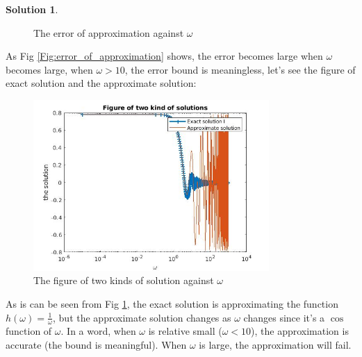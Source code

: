 \documentclass{article}
\theoremstyle{definition}
\newtheorem{solution}{Solution}
\begin{document}
\begin{solution}
\begin{figure}[ht]
      \centering
      \caption{The error of approximation against $\omega$}
    \end{figure}
    As Fig \ref{Fig:error_of_approximation} shows, the error becomes large when $\omega$ becomes large, when $\omega>10$, the error bound is meaningless, let's see the figure of exact solution and the approximate solution:
    \begin{figure}[ht]
      \label{Fig:solution_of_approximation}
      \includegraphics[width=0.8\textwidth]{problem3_solution_figure.jpg}
      \centering
      \caption{The figure of two kinds of solution against $\omega$}
    \end{figure}
    As is can be seen from Fig \ref{Fig:solution_of_approximation}, the exact solution is approximating the function $h(\omega)=\frac{1}{\omega}$, but the approximate solution changes as $\omega$ changes since it's a $\cos$ function of $\omega$. In a word, when $\omega$ is relative small ($\omega<10$), the approximation is accurate (the bound is meaningful). When $\omega$ is large, the approximation will fail.
\end{solution}
\end{document}
